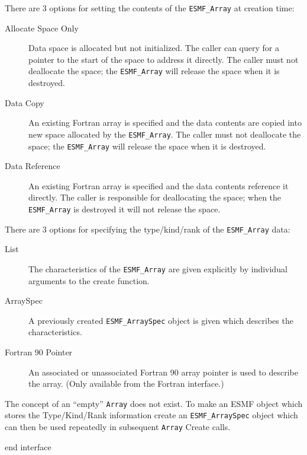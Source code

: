    There are 3 options for setting the contents of the {\tt ESMF\_Array}
   at creation time:
   \begin{description}
   \item[Allocate Space Only]
   Data space is allocated but not initialized. The caller can query
   for a pointer to the start of the space to address it directly.
   The caller must not deallocate the space; the
   {\tt ESMF\_Array} will release the space when it is destroyed.
   \item[Data Copy]
   An existing Fortran array is specified and the data contents are copied
   into new space allocated by the {\tt ESMF\_Array}.
   The caller must not deallocate the space; the
   {\tt ESMF\_Array} will release the space when it is destroyed.
   \item[Data Reference]
   An existing Fortran array is specified and the data contents reference
   it directly. The caller is responsible for deallocating the space;
   when the {\tt ESMF\_Array} is destroyed it will not release the space.
   \end{description}
  
   There are 3 options for
   specifying the type/kind/rank of the {\tt ESMF\_Array} data:
   \begin{description}
   \item[List]
   The characteristics of the {\tt ESMF\_Array} are given explicitly
   by individual arguments to the create function.
   \item[ArraySpec]
   A previously created {\tt ESMF\_ArraySpec} object is given which
   describes the characteristics.
   \item[Fortran 90 Pointer]
   An associated or unassociated Fortran 90 array pointer is used to
   describe the array.
   (Only available from the Fortran interface.)
   \end{description}
  
   The concept of an ``empty'' {\tt Array} does not exist. To make an
   ESMF object which stores the Type/Kind/Rank information create an
   {\tt ESMF\_ArraySpec} object which can then be used repeatedly in
   subsequent {\tt Array} Create calls.
  
 end interface 
 
\mbox{}\hrulefill\ 
 
